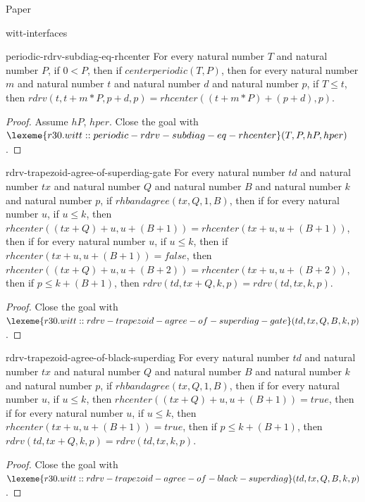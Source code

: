 \begin{lexlean}{Paper}
\begin{section}{witt-interfaces}
  \begin{theorem}{periodic-rdrv-subdiag-eq-rhcenter}
  For every natural number \(T\) and natural number \(P\), if \(0 < P\), then if \(centerperiodic(T, P)\), then for every natural number \(m\) and natural number \(t\) and natural number \(d\) and natural number \(p\), if \(T ≤ t\), then \(rdrv(t, t + m * P, p + d, p) = rhcenter((t + m * P) + (p + d), p)\).
  \begin{proof}
  Assume \(hP\), \(hper\).
  Close the goal with \(\lexeme{r30.witt::periodic-rdrv-subdiag-eq-rhcenter}(T, P, hP, hper)\).
  \end{proof}
  \end{theorem}

  \begin{theorem}{rdrv-trapezoid-agree-of-superdiag-gate}
  For every natural number \(td\) and natural number \(tx\) and natural number \(Q\) and natural number \(B\) and natural number \(k\) and natural number \(p\), if \(rhbandagree(tx, Q, 1, B)\), then if for every natural number \(u\), if \(u ≤ k\), then \(rhcenter((tx + Q) + u, u + (B + 1)) = rhcenter(tx + u, u + (B + 1))\), then if for every natural number \(u\), if \(u ≤ k\), then if \(rhcenter(tx + u, u + (B + 1)) = false\), then \(rhcenter((tx + Q) + u, u + (B + 2)) = rhcenter(tx + u, u + (B + 2))\), then if \(p ≤ k + (B + 1)\), then \(rdrv(td, tx + Q, k, p) = rdrv(td, tx, k, p)\).
  \begin{proof}
  Close the goal with \(\lexeme{r30.witt::rdrv-trapezoid-agree-of-superdiag-gate}(td, tx, Q, B, k, p)\).
  \end{proof}
  \end{theorem}

  \begin{theorem}{rdrv-trapezoid-agree-of-black-superdiag}
  For every natural number \(td\) and natural number \(tx\) and natural number \(Q\) and natural number \(B\) and natural number \(k\) and natural number \(p\), if \(rhbandagree(tx, Q, 1, B)\), then if for every natural number \(u\), if \(u ≤ k\), then \(rhcenter((tx + Q) + u, u + (B + 1)) = true\), then if for every natural number \(u\), if \(u ≤ k\), then \(rhcenter(tx + u, u + (B + 1)) = true\), then if \(p ≤ k + (B + 1)\), then \(rdrv(td, tx + Q, k, p) = rdrv(td, tx, k, p)\).
  \begin{proof}
  Close the goal with \(\lexeme{r30.witt::rdrv-trapezoid-agree-of-black-superdiag}(td, tx, Q, B, k, p)\).
  \end{proof}
  \end{theorem}


\end{section}
\end{lexlean}
